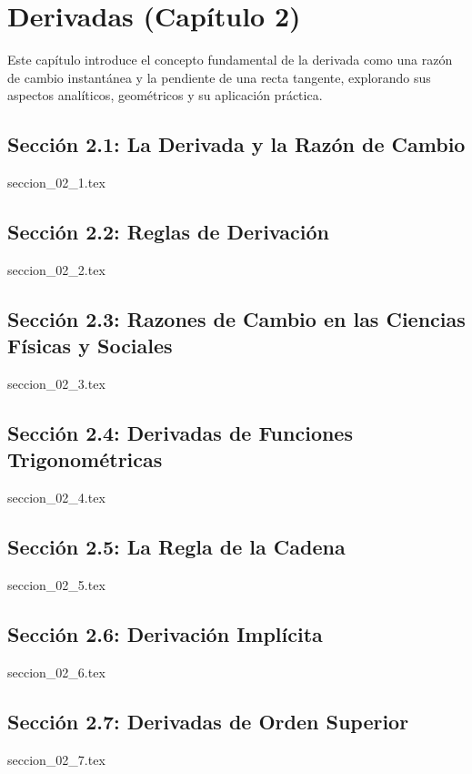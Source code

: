 \chapter{Derivadas (Capítulo 2)}
\label{cap:derivadas}

Este capítulo introduce el concepto fundamental de la derivada como una razón de cambio instantánea y la pendiente de una recta tangente, explorando sus aspectos analíticos, geométricos y su aplicación práctica.

\section{Sección 2.1: La Derivada y la Razón de Cambio}
{seccion_02_1.tex}

\section{Sección 2.2: Reglas de Derivación}
{seccion_02_2.tex}

\section{Sección 2.3: Razones de Cambio en las Ciencias Físicas y Sociales}
{seccion_02_3.tex}

\section{Sección 2.4: Derivadas de Funciones Trigonométricas}
{seccion_02_4.tex}

\section{Sección 2.5: La Regla de la Cadena}
{seccion_02_5.tex}

\section{Sección 2.6: Derivación Implícita}
{seccion_02_6.tex}

\section{Sección 2.7: Derivadas de Orden Superior}
{seccion_02_7.tex}

